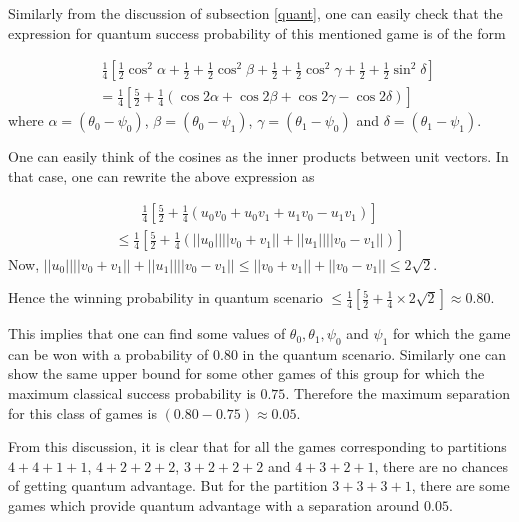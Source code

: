\documentclass[]{svjour3}
\begin{document}
Similarly from the discussion of subsection \ref{quant}, one can easily check that the expression for quantum success probability of this mentioned game is of the form

\begin{align*}
~ &~ \frac{1}{4}\left[\frac{1}{2}\cos^2{\alpha} + \frac{1}{2} + \frac{1}{2} \cos^2 {\beta} + \frac{1}{2} + \frac{1}{2}\cos^2 {\gamma} + \frac{1}{2} + \frac{1}{2} \sin^2 {\delta}\right]\\
~ &= \frac{1}{4}\left[\frac{5}{2} + \frac{1}{4}(\cos{2\alpha} + \cos{2\beta} + \cos{2\gamma} - \cos{2\delta})\right]
\end{align*}
where $\alpha=(\theta_0 - \psi_0)$, $\beta=(\theta_0 - \psi_1)$, $\gamma=(\theta_1 - \psi_0)$ and 
$\delta=(\theta_1 - \psi_1)$. 

One can easily think of the cosines as the inner products between unit vectors. In that case, one can rewrite the above expression as

\begin{align*}
\frac{1}{4}\left[\frac{5}{2} + \frac{1}{4}(u_{0}v_{0} + u_{0}v_{1} + u_{1}v_{0} - u_{1}v_{1})\right]
\end{align*}
\begin{align*}
\le \frac{1}{4} \left[\frac{5}{2} + \frac{1}{4}\left(||u_{0}|| ||v_{0} + v_{1}|| + ||u_{1}|| ||v_{0} - v_{1}||\right) \right]
\end{align*}
Now, $||u_{0}|| ||v_{0} + v_{1}|| + ||u_{1}|| ||v_{0} - v_{1}|| \le ||v_{0} + v_{1}|| + ||v_{0} - v_{1}|| \le 2\sqrt{2}$.

Hence the winning probability in quantum scenario
$\le \frac{1}{4} \left[\frac{5}{2} + \frac{1}{4} \times 2\sqrt{2} \right] \approx 0.80$.

This implies that one can find some values of $\theta_0, \theta_1, \psi_0$ and $\psi_1$ for which the game can be won with a probability of $0.80$ in the quantum scenario. Similarly one can show the same upper bound for some other games of this group for which the maximum classical success probability is $0.75$.
Therefore the maximum separation for this class of games is $(0.80 - 0.75) \approx 0.05$.

From this discussion, it is clear that for all the games corresponding to partitions $4+4+1+1$, $4+2+2+2$, $3+2+2+2$ and $4+3+2+1$, there are no chances of getting quantum advantage. But for the partition $3+3+3+1$, there are some games which provide quantum advantage with a separation around $0.05$.
\end{document}
